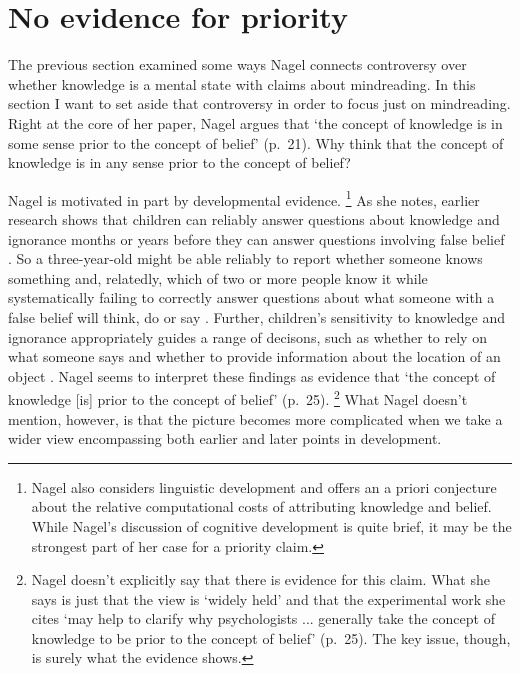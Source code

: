 \documentclass[12pt,\papersize]{extarticle}
\begin{document}




\section{No evidence for priority}
The previous section examined some ways  Nagel connects  controversy over whether knowledge is a mental state with claims about mindreading.
In this section I want to set aside that controversy in order to focus just on mindreading.
Right at the core of her paper, Nagel argues that  `the concept of knowledge is in some sense prior to the concept of belief' (p.\ 21). 
  Why think that the concept of knowledge is in any sense prior to the concept of belief?

Nagel is motivated in part by developmental evidence.%
\footnote{
Nagel also considers linguistic development and offers an a priori conjecture about the relative computational costs of attributing knowledge and belief.
While Nagel's discussion of cognitive development is quite brief, it may be the strongest part of her case for a priority claim.
}
As she notes, earlier research shows that
children can reliably answer questions about knowledge and ignorance months or years before they can answer questions involving false belief \citep{hogrefe_ignorance_1986}.
So a three-year-old might be able reliably to report whether someone knows something and, relatedly, which of two or more people know it while systematically failing to correctly answer questions about what someone with a false belief will think, do or say \citep{Wellman:2001lz}.
Further, children's sensitivity to knowledge and ignorance appropriately guides a range of decisons, 
such as whether to rely on what someone says \citep{Robinson:1999sq,Robinson:2003bh} 
and whether to provide information about the location of an object \citep{Dunham:2000tv,Liszkowski:2008al}.
Nagel seems to interpret these findings as evidence that `the concept of knowledge [is] prior to the concept of belief' (p.\ 25).%
\footnote{
Nagel doesn't explicitly say that there is evidence for this claim.
What she says is just that the view is `widely held' and that  the experimental work she cites `may help to clarify why psychologists ... generally take the concept of knowledge to be prior to the concept of belief' (p.\ 25).
The key issue, though, is surely what the evidence shows.
} 
What Nagel doesn't mention, however, is that the picture becomes more complicated when we take a wider view encompassing both earlier and later points in development.
\end{document}
